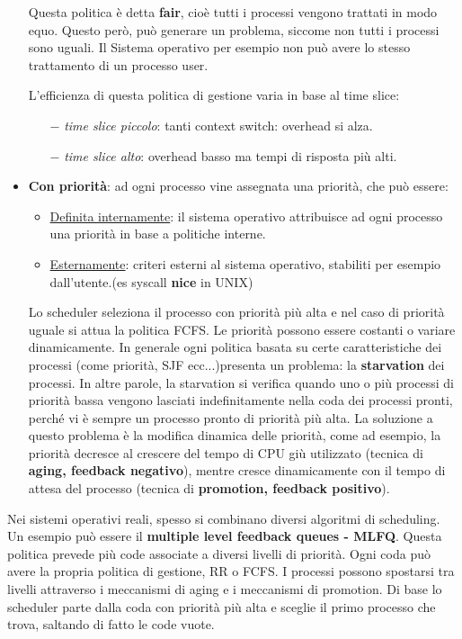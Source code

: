 \documentclass{article}
\begin{document}
\begin{itemize}
    Questa politica è detta \textbf{fair}, cioè tutti i
    processi vengono trattati in modo equo. Questo però,
    può generare un problema, siccome non tutti i processi 
    sono uguali. Il Sistema operativo per esempio non
    può avere lo stesso trattamento di un processo user.
    \medskip

    L'efficienza di questa politica di gestione varia in base
    al time slice:\begin{itemize}
    \item[$-$] \textit{time slice piccolo}: tanti context switch: 
    overhead si alza.
    \item[$-$] \textit{time slice alto}: overhead basso ma
    tempi di risposta più alti.
    \end{itemize}

    \item \textbf{Con priorità}: ad ogni processo vine assegnata una priorità, 
    che può essere:\begin{itemize}
        \item \underline{Definita internamente}: il sistema 
        operativo attribuisce ad ogni processo una priorità in
        base a politiche interne.
        \item \underline{Esternamente}: criteri esterni al
        sistema operativo, stabiliti per esempio dall'utente.(es syscall \textbf{nice}
        in UNIX)
    \end{itemize}

    \noindent Lo scheduler seleziona il processo con priorità  più alta
    e nel caso di priorità uguale si attua la politica 
    FCFS.
    Le priorità possono essere costanti o variare dinamicamente. 
    In generale ogni politica basata su certe caratteristiche dei processi 
    (come priorità, SJF ecc...)presenta un problema:
    la \textbf{starvation} dei processi.
    In altre parole, la starvation si verifica 
    quando uno o più processi di priorità bassa vengono
    lasciati indefinitamente nella coda dei processi pronti,
    perché vi è sempre un processo pronto di priorità più
    alta. La soluzione a questo problema è la modifica 
    dinamica delle priorità, come ad esempio, la priorità
    decresce al crescere del tempo di CPU giù utilizzato
    (tecnica di \textbf{aging, feedback negativo}), mentre cresce
    dinamicamente con il tempo di attesa del processo (tecnica di 
    \textbf{promotion, feedback positivo}).
\end{itemize}

\noindent Nei sistemi operativi reali, spesso si combinano diversi
algoritmi di scheduling. Un esempio può essere il \textbf{multiple 
level feedback queues - MLFQ}. Questa politica prevede più code
associate a diversi livelli di priorità. Ogni coda può avere
la propria politica di gestione, RR o FCFS. I processi
possono spostarsi tra livelli attraverso i meccanismi di 
aging e i meccanismi di promotion. Di base lo scheduler 
parte  dalla coda con priorità più alta e sceglie il primo
 processo che trova, saltando di fatto le code vuote.
\end{document}
